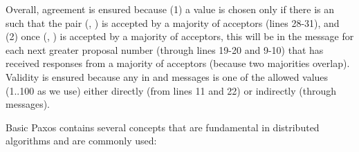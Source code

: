 \documentclass[11pt]{article}
\begin{document}
Overall, agreement is ensured because (1) a value  is chosen
only if there is an  such that the pair (, ) is
accepted by a majority of acceptors (lines 28-31), and (2) once
(, ) is accepted by a majority of acceptors, this 
will be in the  message for each next greater proposal
number (through lines 19-20 and 9-10) that has received responses from
a majority of acceptors (because two majorities overlap).  Validity is
ensured because any  in  and  messages
is one of the allowed values (1..100 as we use) either directly (from
lines 11 and 22) or indirectly (through  messages).


Basic Paxos contains several concepts that are fundamental in
distributed algorithms and are commonly used:
\end{document}
